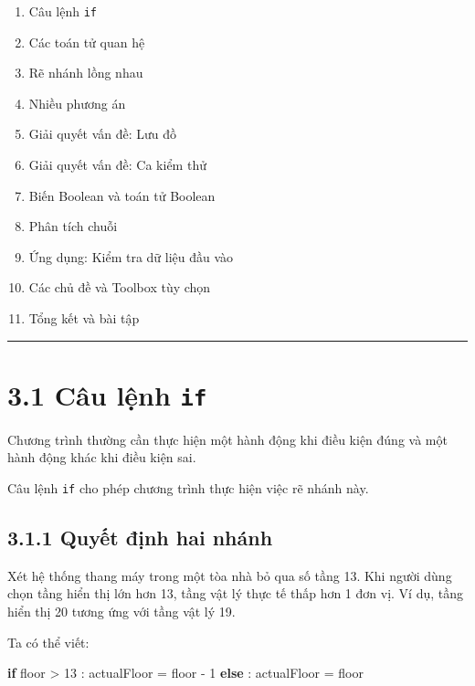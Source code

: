 \documentclass[
  11pt,
  a4paper,
]{article}
\newenvironment{Shaded}{}{}
\newcommand{\ControlFlowTok}[1]{\textcolor[rgb]{0.00,0.44,0.13}{\textbf{#1}}}
\newcommand{\DecValTok}[1]{\textcolor[rgb]{0.25,0.63,0.44}{#1}}
\newcommand{\NormalTok}[1]{#1}
\newcommand{\OperatorTok}[1]{\textcolor[rgb]{0.40,0.40,0.40}{#1}}
\providecommand{\tightlist}{%
  \setlength{\itemsep}{0pt}\setlength{\parskip}{0pt}}
\begin{document}
\begin{enumerate}
\def\labelenumi{\arabic{enumi}.}
\tightlist
\item
  Câu lệnh \texttt{if}
\item
  Các toán tử quan hệ
\item
  Rẽ nhánh lồng nhau
\item
  Nhiều phương án
\item
  Giải quyết vấn đề: Lưu đồ
\item
  Giải quyết vấn đề: Ca kiểm thử
\item
  Biến Boolean và toán tử Boolean
\item
  Phân tích chuỗi
\item
  Ứng dụng: Kiểm tra dữ liệu đầu vào
\item
  Các chủ đề và Toolbox tùy chọn
\item
  Tổng kết và bài tập
\end{enumerate}

\begin{center}\rule{0.5\linewidth}{0.5pt}\end{center}

\section{\texorpdfstring{3.1 Câu lệnh
\texttt{if}}{3.1 Câu lệnh if}}\label{cuxe2u-lux1ec7nh-if}

Chương trình thường cần thực hiện một hành động khi điều kiện đúng và
một hành động khác khi điều kiện sai.

Câu lệnh \texttt{if} cho phép chương trình thực hiện việc rẽ nhánh này.

\subsection{3.1.1 Quyết định hai
nhánh}\label{quyux1ebft-ux111ux1ecbnh-hai-nhuxe1nh}

Xét hệ thống thang máy trong một tòa nhà bỏ qua số tầng 13. Khi người
dùng chọn tầng hiển thị lớn hơn 13, tầng vật lý thực tế thấp hơn 1 đơn
vị. Ví dụ, tầng hiển thị 20 tương ứng với tầng vật lý 19.

Ta có thể viết:

\begin{Shaded}
\begin{Highlighting}[]
\ControlFlowTok{if}\NormalTok{ floor }\OperatorTok{\textgreater{}} \DecValTok{13}\NormalTok{ :}
\NormalTok{    actualFloor }\OperatorTok{=}\NormalTok{ floor }\OperatorTok{{-}} \DecValTok{1}
\ControlFlowTok{else}\NormalTok{ :}
\NormalTok{    actualFloor }\OperatorTok{=}\NormalTok{ floor}
\end{Highlighting}
\end{Shaded}
\end{document}
